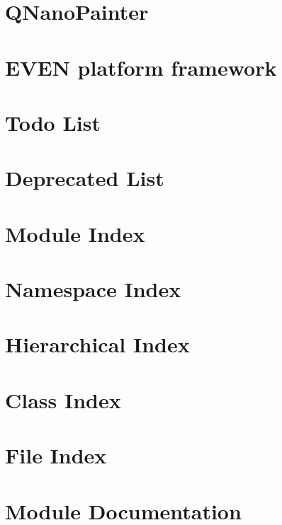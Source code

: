 \documentclass[twoside]{book}
\newcommand{\+}{\discretionary{\mbox{\scriptsize$\hookleftarrow$}}{}{}}
\begin{document}
\chapter{Q\+Nano\+Painter}
\label{md_r-score-demo_sample}

\chapter{E\+V\+EN platform framework}
\label{md__r_e_a_d_m_e}

\chapter{Todo List}
\label{todo}

\chapter{Deprecated List}
\label{deprecated}

\chapter{Module Index}

\chapter{Namespace Index}

\chapter{Hierarchical Index}

\chapter{Class Index}

\chapter{File Index}

\chapter{Module Documentation}



















\end{document}
